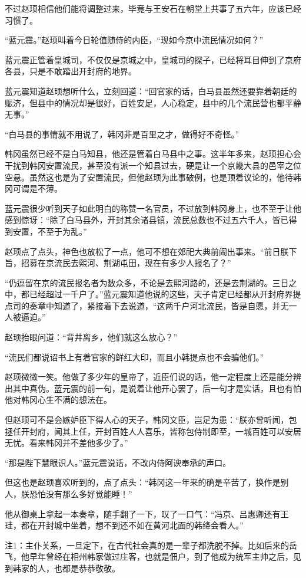不过赵顼相信他们能将调整过来，毕竟与王安石在朝堂上共事了五六年，应该已经习惯了。

“蓝元震。”赵顼叫着今日轮值随侍的内臣，“现如今京中流民情况如何？”

蓝元震正管着皇城司，不仅仅是京城之中，皇城司的探子，已经将耳目伸到了京府各县，只是不敢踏出开封府的地界。

蓝元震知道赵顼想听什么，立刻回道：“回官家的话，白马县虽然还要靠着朝廷的赈济，但县中的情况却是很好，百姓安足，人心稳定，县中的几个流民营也都平静无事。”

“白马县的事情就不用说了，韩冈非是百里之才，做得好不奇怪。”

韩冈虽然已经不是白马知县，他还是管着白马县中之事。这半年多来，赵顼担心会干扰到韩冈安置流民，甚至没有派一个知县过去，硬是让一个京畿大县的邑宰之位空悬。虽然这也是为了安置流民，但他赵顼为此事破例，也是顶着议论的，他待韩冈可谓是不薄。

蓝元震很少听到天子如此明白的称赞一名官员，不过放到韩冈身上，也不至于让他感到惊讶：“除了白马县外，开封其余诸县镇，流民总数也不过五六千人，皆已得到安置，不至于为乱。”

赵顼点了点头，神色也放松了一点，他可不想在郊祀大典前闹出事来。“前日朕下旨，招募在京流民去熙河、荆湖屯田，现在有多少人报名了？”

“仍逗留在京的流民报名者为数众多，不论是去熙河路的，还是去荆湖的。三日之中，都已经超过一千户了。”蓝元震知道他说的这些，天子肯定已经都从开封府界提点司的奏章中知道了，紧接着下去说道，“这两千户河北流民，皆是自愿，并无一人被逼迫。”

赵顼抬眼问道：“背井离乡，他们就这么放心？”

“流民们都说诏书上有着官家的鲜红大印，而且小韩提点也不会骗他们。”

赵顼微微一笑。他做了多少年的皇帝了，近臣们说的话，他一定程度上还是能分辨出其中真伪。蓝元震的前一句，是说着让他开心罢了，后一句才是实话，且也有怕他对韩冈心生不满的想法在。

但赵顼可不是会嫉妒臣下得人心的天子，韩冈文臣，岂足为患：“朕亦曾听闻，包拯任开封府，闻其上任，开封百姓人人喜乐，皆称包侍制即至，一城百姓可以安居无忧。看来韩冈并不差他多少了。”

“那是陛下慧眼识人。”蓝元震说话，不改内侍阿谀奉承的声口。

但这也是赵顼喜欢听到的，点了点头：“韩冈这一年来的确是辛苦了，换作是别人，朕恐怕没有那么多好觉能睡！”

他从御桌上拿起一本奏章，随手翻了一下，叹了一口气：“冯京、吕惠卿还有王珪，都在开封城中坐着，想不到还不如在黄河北面的韩绛会看人。”

注1：主仆关系，一旦定下，在古代社会真的是一辈子都洗脱不掉。比如后来的岳飞，他早年曾经在相州韩家做过庄客，也就是佃户，到了他成为统军主帅之后，见到韩家的人，也都是恭恭敬敬。

